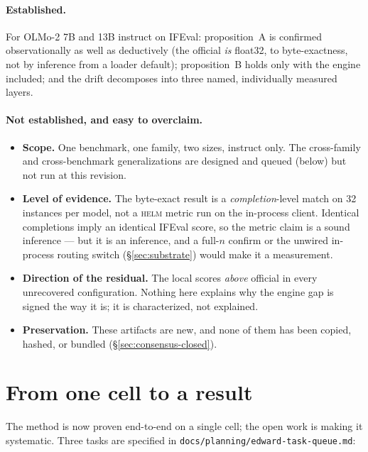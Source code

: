 \documentclass[11pt]{report}
\newcommand{\file}[1]{\texttt{#1}}
\begin{document}
\paragraph{Established.} For OLMo-2 7B and 13B instruct on IFEval: proposition~A is
confirmed observationally as well as deductively (the official \emph{is} float32,
to byte-exactness, not by inference from a loader default); proposition~B holds only
with the engine included; and the drift decomposes into three named, individually
measured layers.

\paragraph{Not established, and easy to overclaim.}
\begin{itemize}[nosep]
  \item \textbf{Scope.} One benchmark, one family, two sizes, instruct only. The
        cross-family and cross-benchmark generalizations are designed and queued
        (below) but not run at this revision.
  \item \textbf{Level of evidence.} The byte-exact result is a \emph{completion}-level
        match on 32 instances per model, not a \textsc{helm} metric run on the
        in-process client. Identical completions imply an identical IFEval score, so
        the metric claim is a sound inference --- but it is an inference, and a
        full-$n$ confirm or the unwired in-process routing switch
        (\S\ref{sec:substrate}) would make it a measurement.
  \item \textbf{Direction of the residual.} The local scores \emph{above} official in
        every unrecovered configuration. Nothing here explains why the engine gap is
        signed the way it is; it is characterized, not explained.
  \item \textbf{Preservation.} These artifacts are new, and none of them has been
        copied, hashed, or bundled (\S\ref{sec:consensus-closed}).
\end{itemize}

\section{From one cell to a result}

The method is now proven end-to-end on a single cell; the open work is making it
systematic. Three tasks are specified in
\file{docs/planning/edward-task-queue.md}:
\end{document}
